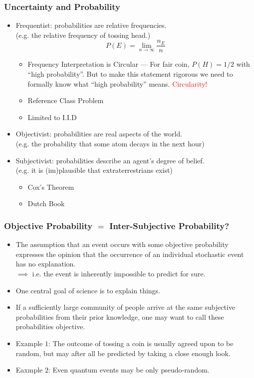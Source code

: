 \documentclass[UTF8,11pt,colorlinks,compress,openany]{beamer}%
\begin{document}
\begin{frame}\frametitle{Uncertainty and Probability}
\begin{itemize}
	\item Frequentist: probabilities are relative frequencies.\\
	(e.g. the relative frequency of tossing head.)
	\[P(E)=\lim\limits_{n\to\infty}\frac{n_E}{n}\]
	\begin{itemize}
		\item Frequency Interpretation is Circular --- For fair coin, $P(H) = 1/2$ with ``high probability''. But to make this statement rigorous we need to formally know what ``high probability'' means. \hfill \textcolor{red}{Circularity!}
		\item Reference Class Problem
		\item Limited to I.I.D
	\end{itemize}
	\item Objectivist: probabilities are real aspects of the world.\\
	(e.g. the probability that some atom decays in the next hour)
	\item Subjectivist: probabilities describe an agent's degree of belief.\\
	(e.g. it is (im)plausible that extraterrestrians exist)
	\begin{itemize}
		\item Cox's Theorem
		\item Dutch Book
	\end{itemize}
\end{itemize}
\end{frame}

\begin{frame}\frametitle{Objective Probability $=$ Inter-Subjective Probability?}
\begin{itemize}
	\item The assumption that an event occurs with some objective probability expresses the opinion that the occurrence of an individual stochastic event has no explanation.\\
	$\implies$ i.e. the event is inherently impossible to predict for sure.
	\item One central goal of science is to explain things.
	\item If a sufficiently large community of people arrive at the same subjective probabilities from their prior knowledge, one may want to call these probabilities objective.
	\item Example $1$: The outcome of tossing a coin is usually agreed upon to be random, but may after all be predicted by taking a close enough look.
	\item Eaxmple $2$: Even quantum events may be only pseudo-random.
\end{itemize}	
\end{frame}
\end{document}
